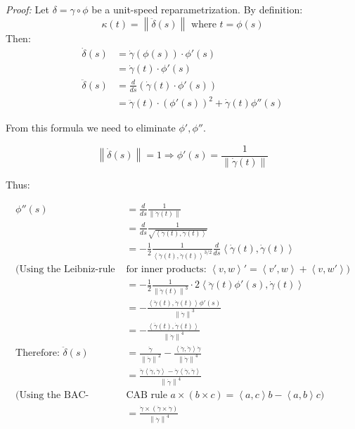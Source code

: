 \documentclass[a4paper,11pt,notitlepage,fullpage]{paper}
\theoremstyle{plain}
\theoremstyle{definition}
\begin{document}
\emph{Proof:} Let $\delta = \gamma \circ \phi$ be a unit-speed reparametrization. By definition:
\begin{equation*}
\kappa(t) = \left\|\ddot\delta(s)\right\|\text{ where }t = \phi(s)
\end{equation*}
Then:
\begin{align*}
\dot\delta(s) &= \dot\gamma\left(\phi(s)\right) \cdot \phi'(s) \\
			  &= \dot\gamma(t) \cdot \phi'(s) \\
\ddot\delta(s) &= \frac{d}{ds} \left(\dot\gamma(t) \cdot \phi'(s)\right) \\
			   &= \ddot\gamma(t) \cdot \left(\phi'(s)\right)^2 + \dot\gamma(t)\phi''(s)
\end{align*}

From this formula we need to eliminate $\phi', \phi''$.

\begin{equation*}
\left\|\dot\delta(s)\right\| = 1 \Rightarrow \phi'(s) = \frac{1}{\left\|\dot\gamma(t)\right\|}
\end{equation*}

Thus:

\begin{align*}
\phi''(s) &= \frac{d}{ds} \frac{1}{\left\|\dot\gamma(t)\right\|} \\
&= \frac{d}{ds} \frac{1}{\sqrt{\left\langle\dot\gamma(t), \dot\gamma(t)\right\rangle}} \\
&= - \frac{1}{2} \frac{1}{\left\langle\dot\gamma(t), \dot\gamma(t)\right\rangle^{3/2}} \frac{d}{ds} \left\langle\dot\gamma(t), \dot\gamma(t)\right\rangle \\
\Big(\text{Using the Leibniz-rule }&\text{for inner products: } \left\langle v,w\right\rangle' = \left\langle v',w\right\rangle + \left\langle v,w'\right\rangle \Big) \\
&= - \frac{1}{2} \frac{1}{\left\|\dot\gamma(t)\right\|^3} \cdot 2 \left\langle\ddot\gamma(t) \phi'(s), \dot\gamma(t)\right\rangle \\
&= - \frac{\left\langle\ddot\gamma(t), \dot\gamma(t)\right\rangle \phi'(s)}{\left\|\dot\gamma\right\|^3} \\
&= - \frac{\left\langle\ddot\gamma(t), \dot\gamma(t)\right\rangle}{\left\|\dot\gamma\right\|^4} \\
\text{Therefore: }\ddot\delta(s) &= \frac{\ddot\gamma}{\left\|\dot\gamma\right\|^2} - \frac{\left\langle\dot\gamma, \ddot\gamma\right\rangle \dot\gamma}{\left\|\dot\gamma\right\|^4} \\
&= \frac{\ddot\gamma \left\langle\dot\gamma, \dot\gamma\right\rangle - \dot\gamma\left\langle\dot\gamma, \ddot\gamma\right\rangle}{\left\|\dot\gamma\right\|^4} \\
\Big(\text{Using the BAC-}& \text{CAB rule } a \times (b\times c) = \left\langle a,c\right\rangle b - \left\langle a,b\right\rangle c \Big) \\
&= \frac{\dot\gamma \times (\ddot\gamma \times \dot\gamma)}{\left\|\dot\gamma\right\|^4}
\end{align*}
\end{document}

